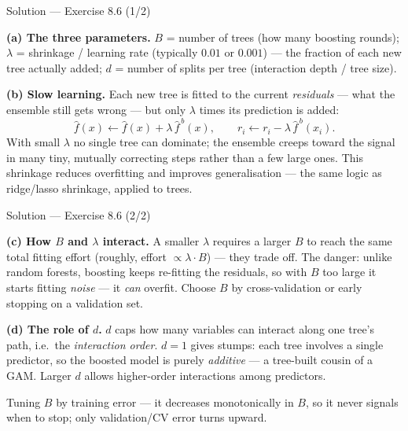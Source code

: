 \documentclass[aspectratio=169,11pt]{beamer}
\begin{document}
\begin{frame}{Solution --- Exercise 8.6 (1/2)}
\begin{solutionbox}
\textbf{(a) The three parameters.} $B$ = number of trees (how many boosting rounds); $\lambda$ = shrinkage / learning rate (typically $0.01$ or $0.001$) --- the fraction of each new tree actually added; $d$ = number of splits per tree (interaction depth / tree size).

\medskip
\textbf{(b) Slow learning.} Each new tree is fitted to the current \emph{residuals} --- what the ensemble still gets wrong --- but only $\lambda$ times its prediction is added:
\[ \hat f(x)\leftarrow\hat f(x)+\lambda\,\hat f^{\,b}(x),\qquad r_i\leftarrow r_i-\lambda\,\hat f^{\,b}(x_i). \]
With small $\lambda$ no single tree can dominate; the ensemble creeps toward the signal in many tiny, mutually correcting steps rather than a few large ones. This shrinkage reduces overfitting and improves generalisation --- the same logic as ridge/lasso shrinkage, applied to trees.
\end{solutionbox}
\end{frame}

\begin{frame}{Solution --- Exercise 8.6 (2/2)}
\begin{solutionbox}
\textbf{(c) How $B$ and $\lambda$ interact.} A smaller $\lambda$ requires a larger $B$ to reach the same total fitting effort (roughly, effort $\propto \lambda\cdot B$) --- they trade off. The danger: unlike random forests, boosting keeps re-fitting the residuals, so with $B$ too large it starts fitting \emph{noise} --- it \emph{can} overfit. Choose $B$ by cross-validation or early stopping on a validation set.

\medskip
\textbf{(d) The role of $d$.} $d$ caps how many variables can interact along one tree's path, i.e.\ the \emph{interaction order}. $d=1$ gives stumps: each tree involves a single predictor, so the boosted model is purely \emph{additive} --- a tree-built cousin of a GAM. Larger $d$ allows higher-order interactions among predictors.
\end{solutionbox}
\begin{mistake}
Tuning $B$ by training error --- it decreases monotonically in $B$, so it never signals when to stop; only validation/CV error turns upward.
\end{mistake}
\end{frame}



\end{document}
